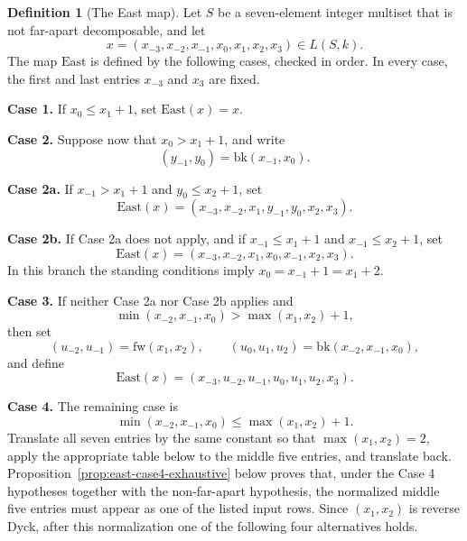 \documentclass[11pt]{article}
\theoremstyle{plain}
\theoremstyle{definition}
\newtheorem{definition}[theorem]{Definition}
\theoremstyle{remark}
\begin{document}
\begin{definition}[The East map]
\label{def:east}
Let \(S\) be a seven-element integer multiset that is not far-apart
decomposable, and let
\[
  x=(x_{-3},x_{-2},x_{-1},x_0,x_1,x_2,x_3)\in L(S,k).
\]
The map \(\mathrm{East}\) is defined by the following cases, checked in order.
In every case, the first and last entries \(x_{-3}\) and \(x_3\) are fixed.

\smallskip
\noindent\textbf{Case 1.} If \(x_0\le x_1+1\), set \(\mathrm{East}(x)=x\).

\smallskip
\noindent\textbf{Case 2.} Suppose now that \(x_0>x_1+1\), and write
\[
  (y_{-1},y_0)=\mathrm{bk}(x_{-1},x_0).
\]

\smallskip
\noindent\textbf{Case 2a.} If \(x_{-1}>x_1+1\) and \(y_0\le x_2+1\), set
\[
  \mathrm{East}(x)=
  (x_{-3},x_{-2},x_1,y_{-1},y_0,x_2,x_3).
\]

\smallskip
\noindent\textbf{Case 2b.} If Case 2a does not apply, and if
\(x_{-1}\le x_1+1\) and \(x_{-1}\le x_2+1\), set
\[
  \mathrm{East}(x)=
  (x_{-3},x_{-2},x_1,x_0,x_{-1},x_2,x_3).
\]
In this branch the standing conditions imply
\(x_0=x_{-1}+1=x_1+2\).

\smallskip
\noindent\textbf{Case 3.} If neither Case 2a nor Case 2b applies and
\[
  \min(x_{-2},x_{-1},x_0)>\max(x_1,x_2)+1,
\]
then set
\[
  (u_{-2},u_{-1})=\mathrm{fw}(x_1,x_2),
  \qquad
  (u_0,u_1,u_2)=\mathrm{bk}(x_{-2},x_{-1},x_0),
\]
and define
\[
  \mathrm{East}(x)=
  (x_{-3},u_{-2},u_{-1},u_0,u_1,u_2,x_3).
\]

\smallskip
\noindent\textbf{Case 4.} The remaining case is
\[
  \min(x_{-2},x_{-1},x_0)\le \max(x_1,x_2)+1.
\]
Translate all seven entries by the same constant so that
\(\max(x_1,x_2)=2\), apply the appropriate table below to the middle five
entries, and translate back.  Proposition~\ref{prop:east-case4-exhaustive}
below proves that, under the Case 4 hypotheses together with the
non-far-apart hypothesis, the normalized middle five entries must appear as
one of the listed input rows.  Since
\((x_1,x_2)\) is reverse Dyck, after this normalization one of the following
four alternatives holds.


\end{definition}
\end{document}
